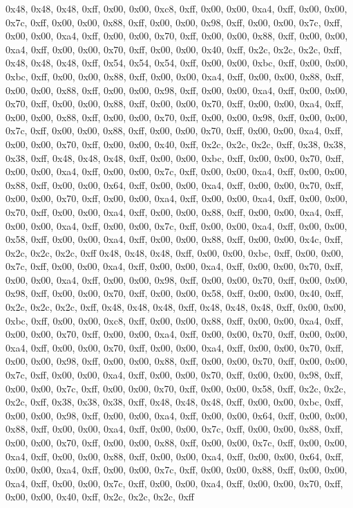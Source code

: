 0x48, 0x48, 0x48, 0xff, 0x00, 0x00, 0xc8, 0xff, 0x00, 0x00, 0xa4, 0xff, 0x00, 0x00, 0x7c, 0xff, 0x00, 0x00, 0x88, 0xff, 0x00, 0x00, 0x98, 0xff, 0x00, 0x00, 0x7c, 0xff, 0x00, 0x00, 0xa4, 0xff, 0x00, 0x00, 0x70, 0xff, 0x00, 0x00, 0x88, 0xff, 0x00, 0x00, 0xa4, 0xff, 0x00, 0x00, 0x70, 0xff, 0x00, 0x00, 0x40, 0xff, 0x2c, 0x2c, 0x2c, 0xff, 0x48, 0x48, 0x48, 0xff, 0x54, 0x54, 0x54, 0xff, 0x00, 0x00, 0xbc, 0xff, 0x00, 0x00, 0xbc, 0xff, 0x00, 0x00, 0x88, 0xff, 0x00, 0x00, 0xa4, 0xff, 0x00, 0x00, 0x88, 0xff, 0x00, 0x00, 0x88, 0xff, 0x00, 0x00, 0x98, 0xff, 0x00, 0x00, 0xa4, 0xff, 0x00, 0x00, 0x70, 0xff, 0x00, 0x00, 0x88, 0xff, 0x00, 0x00, 0x70, 0xff, 0x00, 0x00, 0xa4, 0xff, 0x00, 0x00, 0x88, 0xff, 0x00, 0x00, 0x70, 0xff, 0x00, 0x00, 0x98, 0xff, 0x00, 0x00, 0x7c, 0xff, 0x00, 0x00, 0x88, 0xff, 0x00, 0x00, 0x70, 0xff, 0x00, 0x00, 0xa4, 0xff, 0x00, 0x00, 0x70, 0xff, 0x00, 0x00, 0x40, 0xff, 0x2c, 0x2c, 0x2c, 0xff, 0x38, 0x38, 0x38, 0xff, 0x48, 0x48, 0x48, 0xff, 0x00, 0x00, 0xbc, 0xff, 0x00, 0x00, 0x70, 0xff, 0x00, 0x00, 0xa4, 0xff, 0x00, 0x00, 0x7c, 0xff, 0x00, 0x00, 0xa4, 0xff, 0x00, 0x00, 0x88, 0xff, 0x00, 0x00, 0x64, 0xff, 0x00, 0x00, 0xa4, 0xff, 0x00, 0x00, 0x70, 0xff, 0x00, 0x00, 0x70, 0xff, 0x00, 0x00, 0xa4, 0xff, 0x00, 0x00, 0xa4, 0xff, 0x00, 0x00, 0x70, 0xff, 0x00, 0x00, 0xa4, 0xff, 0x00, 0x00, 0x88, 0xff, 0x00, 0x00, 0xa4, 0xff, 0x00, 0x00, 0xa4, 0xff, 0x00, 0x00, 0x7c, 0xff, 0x00, 0x00, 0xa4, 0xff, 0x00, 0x00, 0x58, 0xff, 0x00, 0x00, 0xa4, 0xff, 0x00, 0x00, 0x88, 0xff, 0x00, 0x00, 0x4c, 0xff, 0x2c, 0x2c, 0x2c, 0xff
0x48, 0x48, 0x48, 0xff, 0x00, 0x00, 0xbc, 0xff, 0x00, 0x00, 0x7c, 0xff, 0x00, 0x00, 0xa4, 0xff, 0x00, 0x00, 0xa4, 0xff, 0x00, 0x00, 0x70, 0xff, 0x00, 0x00, 0xa4, 0xff, 0x00, 0x00, 0x98, 0xff, 0x00, 0x00, 0x70, 0xff, 0x00, 0x00, 0x98, 0xff, 0x00, 0x00, 0x70, 0xff, 0x00, 0x00, 0x58, 0xff, 0x00, 0x00, 0x40, 0xff, 0x2c, 0x2c, 0x2c, 0xff, 0x48, 0x48, 0x48, 0xff, 0x48, 0x48, 0x48, 0xff, 0x00, 0x00, 0xbc, 0xff, 0x00, 0x00, 0xc8, 0xff, 0x00, 0x00, 0x88, 0xff, 0x00, 0x00, 0xa4, 0xff, 0x00, 0x00, 0x70, 0xff, 0x00, 0x00, 0xa4, 0xff, 0x00, 0x00, 0x70, 0xff, 0x00, 0x00, 0xa4, 0xff, 0x00, 0x00, 0x70, 0xff, 0x00, 0x00, 0xa4, 0xff, 0x00, 0x00, 0x70, 0xff, 0x00, 0x00, 0x98, 0xff, 0x00, 0x00, 0x88, 0xff, 0x00, 0x00, 0x70, 0xff, 0x00, 0x00, 0x7c, 0xff, 0x00, 0x00, 0xa4, 0xff, 0x00, 0x00, 0x70, 0xff, 0x00, 0x00, 0x98, 0xff, 0x00, 0x00, 0x7c, 0xff, 0x00, 0x00, 0x70, 0xff, 0x00, 0x00, 0x58, 0xff, 0x2c, 0x2c, 0x2c, 0xff, 0x38, 0x38, 0x38, 0xff, 0x48, 0x48, 0x48, 0xff, 0x00, 0x00, 0xbc, 0xff, 0x00, 0x00, 0x98, 0xff, 0x00, 0x00, 0xa4, 0xff, 0x00, 0x00, 0x64, 0xff, 0x00, 0x00, 0x88, 0xff, 0x00, 0x00, 0xa4, 0xff, 0x00, 0x00, 0x7c, 0xff, 0x00, 0x00, 0x88, 0xff, 0x00, 0x00, 0x70, 0xff, 0x00, 0x00, 0x88, 0xff, 0x00, 0x00, 0x7c, 0xff, 0x00, 0x00, 0xa4, 0xff, 0x00, 0x00, 0x88, 0xff, 0x00, 0x00, 0xa4, 0xff, 0x00, 0x00, 0x64, 0xff, 0x00, 0x00, 0xa4, 0xff, 0x00, 0x00, 0x7c, 0xff, 0x00, 0x00, 0x88, 0xff, 0x00, 0x00, 0xa4, 0xff, 0x00, 0x00, 0x7c, 0xff, 0x00, 0x00, 0xa4, 0xff, 0x00, 0x00, 0x70, 0xff, 0x00, 0x00, 0x40, 0xff, 0x2c, 0x2c, 0x2c, 0xff
